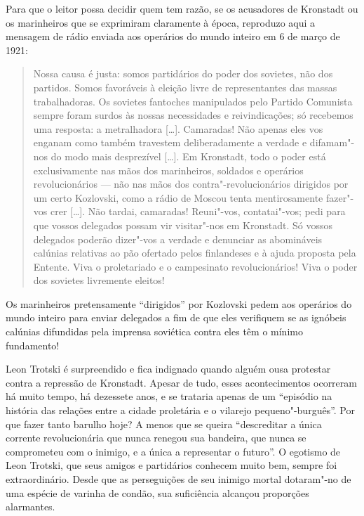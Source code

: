 Para que o leitor possa decidir quem tem razão, se os acusadores de
Kronstadt ou os marinheiros que se exprimiram claramente à época,
reproduzo aqui a mensagem de rádio enviada aos operários do mundo
inteiro em 6 de março de 1921: 

\begin{quote}
Nossa causa é justa: somos partidários
do poder dos sovietes, não dos partidos. Somos favoráveis à eleição
livre de representantes das massas trabalhadoras. Os sovietes fantoches
manipulados pelo Partido Comunista sempre foram surdos às nossas
necessidades e reivindicações; só recebemos uma resposta: a metralhadora
[\ldots]. Camaradas! Não apenas eles vos enganam como também travestem
deliberadamente a verdade e difamam"-nos do modo mais desprezível
[\ldots]. Em Kronstadt, todo o poder está exclusivamente nas mãos dos
marinheiros, soldados e operários revolucionários --- não nas mãos dos
contra"-revolucionários dirigidos por um certo Kozlovski, como a rádio
de Moscou tenta mentirosamente fazer"-vos crer [\ldots]. Não tardai,
camaradas! Reuni"-vos, contatai"-vos; pedi para que vossos delegados
possam vir visitar"-nos em Kronstadt. Só vossos delegados poderão
dizer"-vos a verdade e denunciar as abomináveis calúnias relativas ao
pão ofertado pelos finlandeses e à ajuda proposta pela Entente. Viva o
proletariado e o campesinato revolucionários! Viva o poder dos sovietes
livremente eleitos!
\end{quote}

Os marinheiros pretensamente “dirigidos” por Kozlovski pedem aos
operários do mundo inteiro para enviar delegados a fim de que eles
verifiquem se as ignóbeis calúnias difundidas pela imprensa soviética
contra eles têm o mínimo fundamento!

Leon Trotski é surpreendido e fica indignado quando alguém ousa protestar
contra a repressão de Kronstadt. Apesar de tudo, esses acontecimentos
ocorreram há muito tempo, há dezessete anos, e se trataria apenas de um
“episódio na história das relações entre a cidade proletária e o
vilarejo pequeno"-burguês”. Por que fazer tanto barulho hoje? A menos
que se queira “descreditar a única corrente revolucionária que nunca
renegou sua bandeira, que nunca se comprometeu com o inimigo, e a única
a representar o futuro”. O egotismo de Leon Trotski, que seus amigos e
partidários conhecem muito bem, sempre foi extraordinário. Desde que as
perseguições de seu inimigo mortal dotaram"-no de uma espécie de
varinha de condão, sua suficiência alcançou proporções alarmantes.

